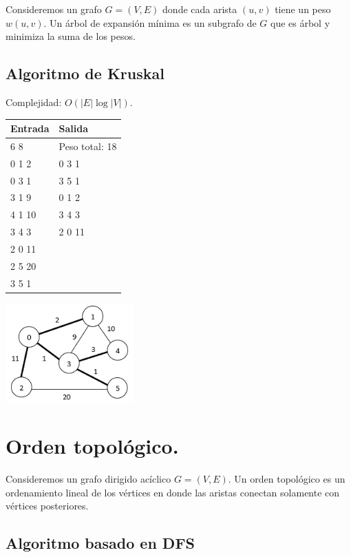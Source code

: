 \documentclass[12pt, letterpaper, twoside]{article}
\begin{document}
Consideremos un grafo $G = (V, E)$ donde cada arista $(u, v)$ tiene un peso $w(u,v)$. Un árbol de expansión mínima es un subgrafo de $G$ que es árbol y minimiza la suma de los pesos.

\subsection{Algoritmo de Kruskal}

Complejidad: $O(|E| \log|V|)$.

 \medskip

\begin{tabular}{|p{7cm}|p{7cm}|}
\hline
\textbf{Entrada} & \textbf{Salida}\\ \hline
6 8    & Peso total: 18\\
0 1 2  & 0 3 1\\
0 3 1  & 3 5 1\\
3 1 9  & 0 1 2\\
4 1 10 & 3 4 3\\
3 4 3  & 2 0 11\\
2 0 11 & \\
2 5 20 & \\
3 5 1  & \\ \hline
\end{tabular}

\begin{center}
\includegraphics[width = 0.37\textwidth]{MST.png}
\end{center}

\newpage

\section{Orden topológico.}

Consideremos un grafo dirigido acíclico $G = (V, E)$. Un orden topológico es un ordenamiento lineal de los vértices en donde las aristas conectan solamente con vértices posteriores.

\subsection{Algoritmo basado en DFS}
\end{document}
